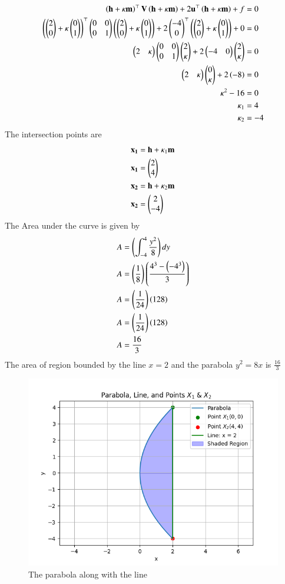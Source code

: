 \documentclass[journal]{IEEEtran}
\begin{document}
\begin{align}
\left(\mathbf{h}+\kappa\mathbf{m}\right)^\top\mathbf{V}\left(\mathbf{h}+\kappa\mathbf{m}\right) + 2\mathbf{u}^\top\left(\mathbf{h}+\kappa\mathbf{m}\right) + f &= 0\\
\left(\begin{pmatrix}2\\0\end{pmatrix}+\kappa\begin{pmatrix}0\\1\end{pmatrix}\right)^\top\begin{pmatrix}0 & 0\\0 & 1\end{pmatrix}\left(\begin{pmatrix}2\\0\end{pmatrix}+\kappa\begin{pmatrix}0\\1\end{pmatrix}\right) + 2\begin{pmatrix}-4\\0\end{pmatrix}^\top\left(\begin{pmatrix}2\\0\end{pmatrix}+\kappa\begin{pmatrix}0\\1\end{pmatrix}\right) + 0 &= 0\\
\begin{pmatrix}2&\kappa\end{pmatrix}\begin{pmatrix}0&0\\0&1\end{pmatrix}\begin{pmatrix}2\\\kappa\end{pmatrix}+2\begin{pmatrix}-4&0\end{pmatrix}\begin{pmatrix}2\\\kappa\end{pmatrix} &= 0\\
\begin{pmatrix}2&\kappa\end{pmatrix}\begin{pmatrix}0\\\kappa\end{pmatrix}+2\left(-8\right) &= 0\\
\kappa^2-16 &= 0\\
\kappa_1&=4\\
\kappa_2&=-4\\
\end{align}
The intersection points are
\begin{align}
\mathbf{x_1} &= \mathbf{h}+\kappa_1\mathbf{m}\\
\mathbf{x_1} &= \begin{pmatrix}2\\4\end{pmatrix}\\
\mathbf{x_2} &= \mathbf{h}+\kappa_2\mathbf{m}\\
\mathbf{x_2} &= \begin{pmatrix}2\\-4\end{pmatrix}
\end{align}
The Area under the curve is given by
\begin{align}
A &= \left(\int_{-4}^{4} \frac{y^2}{8}\right)dy\\
A &= \left(\frac{1}{8}\right)\left(\frac{4^3 - \left(-4^3\right)}{3}\right)\\
A &= \left(\frac{1}{24}\right)\left(128\right)\\
A &= \left(\frac{1}{24}\right)\left(128\right)\\
A &= \frac{16}{3}
\end{align}
The area of region bounded by the line $x=2$ and the parabola $y^2=8x$ is $\frac{16}{3}$
\begin{figure}[h!]
   \centering
   \includegraphics[width = 1\linewidth]{figs/fig.png}
   \caption{The parabola along with the line}
   \label{stemplot}
\end{figure}
\end{document}
